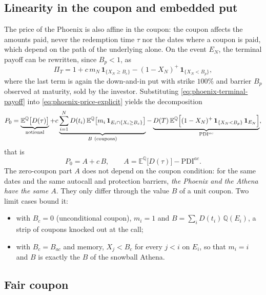 \documentclass[11pt,a4paper]{article}
\newcommand{\ind}{\mathbf{1}}
\begin{document}
\subsection{Linearity in the coupon and embedded put}

The price of the Phoenix is also affine in the coupon: the coupon affects
the amounts paid, never the redemption time $\tau$ nor the dates where a
coupon is paid, which depend on the path of the underlying alone. On the
event $E_N$, the terminal payoff can be rewritten, since $B_p < 1$, as
\begin{equation}
  \Pi_T = 1 + c\, m_N\, \ind_{\{X_N \geq B_c\}}
        - (1 - X_N)^+ \, \ind_{\{X_N < B_p\}} ,
  \label{eq:phoenix-terminal-payoff}
\end{equation}
where the last term is again the down-and-in put with strike $100\%$ and
barrier $B_p$ observed at maturity, sold by the investor. Substituting
\eqref{eq:phoenix-terminal-payoff} into \eqref{eq:phoenix-price-explicit}
yields the decomposition
\begin{equation}
  P_0 = \underbrace{\mathbb{E}^{\mathbb{Q}}\bigl[ D(\tau) \bigr]}_{\text{notional}}
      + c \underbrace{\sum_{i=1}^{N} D(t_i)\,
        \mathbb{E}^{\mathbb{Q}}\bigl[ m_i\, \ind_{E_i \cap \{X_i \geq B_c\}} \bigr]}_{B \ (\text{coupons})}
      - \underbrace{D(T)\, \mathbb{E}^{\mathbb{Q}}\Bigl[ (1 - X_N)^+ \,
        \ind_{\{X_N < B_p\}}\, \ind_{E_N} \Bigr]}_{\mathrm{PDI}^{ac}} ,
  \label{eq:phoenix-pdi}
\end{equation}
that is
\begin{equation}
  P_0 = A + c\, B,
  \qquad
  A = \mathbb{E}^{\mathbb{Q}}\bigl[ D(\tau) \bigr] - \mathrm{PDI}^{ac}.
\end{equation}
The zero-coupon part $A$ does not depend on the coupon condition: for the
same dates and the same autocall and protection barriers, \emph{the Phoenix
and the Athena have the same $A$}. They only differ through the value $B$
of a unit coupon. Two limit cases bound it:
\begin{itemize}
  \item with $B_c = 0$ (unconditional coupon), $m_i = 1$ and
        $B = \sum_i D(t_i)\, \mathbb{Q}(E_i)$, a strip of coupons knocked
        out at the call;
  \item with $B_c = B_{ac}$ and memory, $X_j < B_c$ for every $j < i$ on
        $E_i$, so that $m_i = i$ and $B$ is exactly the $B$ of the snowball
        Athena.
\end{itemize}

\subsection{Fair coupon}
\end{document}
